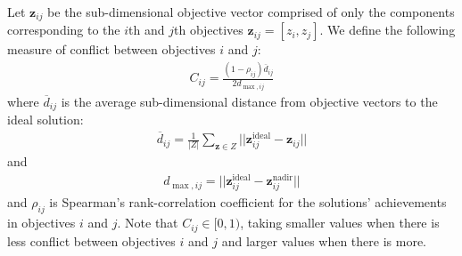 Let $\mathbf{z}_{ij}$ be the sub-dimensional objective vector comprised of only the components corresponding to the $i$th and $j$th objectives $\mathbf{z}_{ij} = [z_i,z_j]$. We define the following measure of conflict between objectives $i$ and $j$:
\begin{align}
C_{ij} = \frac{(1-\rho_{ij})\overbar{d}_{ij}}{2 d_{\max,ij}} \label{eqn:defConflict}
\end{align}
where $\overbar{d}_{ij}$ is the average sub-dimensional distance from objective vectors to the ideal solution:
\begin{align}
\overbar{d}_{ij} = \frac{1}{|Z|} \sum_{\mathbf{z} \in Z} ||\mathbf{z}^{\text{ideal}}_{ij} - \mathbf{z}_{ij}||
\end{align}
and
\begin{align}
d_{\max,ij} = ||\mathbf{z}^{\text{ideal}}_{ij} - \mathbf{z}^{\text{nadir}}_{ij}||
\end{align}
and $\rho_{ij}$ is Spearman's rank-correlation coefficient for the solutions' achievements in objectives $i$ and $j$. Note that $C_{ij} \in [0,1)$, taking smaller values when there is less conflict between objectives $i$ and $j$ and larger values when there is more.

